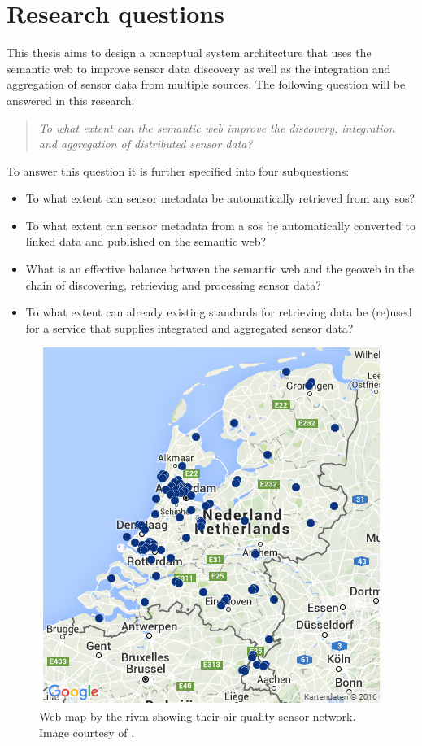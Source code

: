 \section{Research questions}
This thesis aims to design a conceptual system architecture that uses the semantic web to improve sensor data discovery as well as the integration and aggregation of sensor data from multiple sources. The following question will be answered in this research:    

\begin{quote}
	\textit{To what extent can the semantic web improve the discovery, integration and aggregation of distributed sensor data?}
\end{quote}

To answer this question it is further specified into four subquestions:
\begin{itemize}
	\item To what extent can sensor metadata be automatically retrieved from any \acl{sos}?
	\item To what extent can sensor metadata from a \acl{sos} be automatically converted to linked data and published on the semantic web?
	\item  What is an effective balance between the semantic web and the geoweb in the chain of discovering, retrieving and processing sensor data?
	\item To what extent can already existing standards for retrieving data be (re)used for a service that supplies integrated and aggregated sensor data?
\end{itemize}

\begin{figure}
	\centering
	\includegraphics[width=0.8\linewidth]{figs/RIVMSensors.png}
	\caption{Web map by the \acf*{rivm} showing their air quality sensor network. Image courtesy of \cite{DATA:RIVM}.}
	\label{fig:RIVMSensor}
\end{figure}

